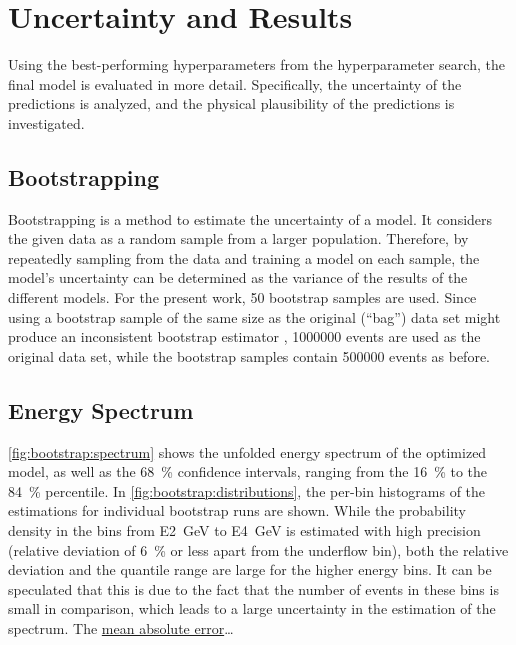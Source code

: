 \section{Uncertainty and Results}
Using the best-performing hyperparameters from the hyperparameter search, %
the final model is evaluated in more detail.
Specifically,
  the uncertainty of the predictions is analyzed, %
  and the physical plausibility of the predictions is investigated.


\subsection{Bootstrapping}
Bootstrapping \cite{bootstrap} is a method to estimate the uncertainty of a model.
It considers the given data as a random sample from a larger population.
Therefore,
by repeatedly sampling from the data and training a model on each sample,
the model's uncertainty can be determined
as the variance of the results of the different models.
%
For the present work, \num{50} bootstrap samples are used.
Since using a bootstrap sample of the same size as the original (\enquote{bag}) data set
might produce an inconsistent bootstrap estimator \cite{bootstrap_samplesize},
\num{1000000} events are used as the original data set,
while the bootstrap samples contain \num{500000} events as before.


\subsection{Energy Spectrum}
\autoref{fig:bootstrap:spectrum} shows the unfolded energy spectrum of the optimized model,
as well as the \SI{68}{\percent} confidence intervals,
  ranging from the \SI{16}{\percent} to the \SI{84}{\percent} percentile.
In \autoref{fig:bootstrap:distributions},
the per-bin histograms of the estimations for individual bootstrap runs are shown.
While the probability density in the bins from \SI{E2}{\giga\electronvolt} to \SI{E4}{\giga\electronvolt} is estimated with high precision
  (relative deviation of \SI{6}{\percent} or less apart from the underflow bin),
both the relative deviation and the quantile range are large for the higher energy bins.
It can be speculated that this is due to the fact that the number of events in these bins is small in comparison,
which leads to a large uncertainty in the estimation of the spectrum.
%
%
The \hyperref[sec:unfolding:metrics:mae]{mean absolute error}… %

